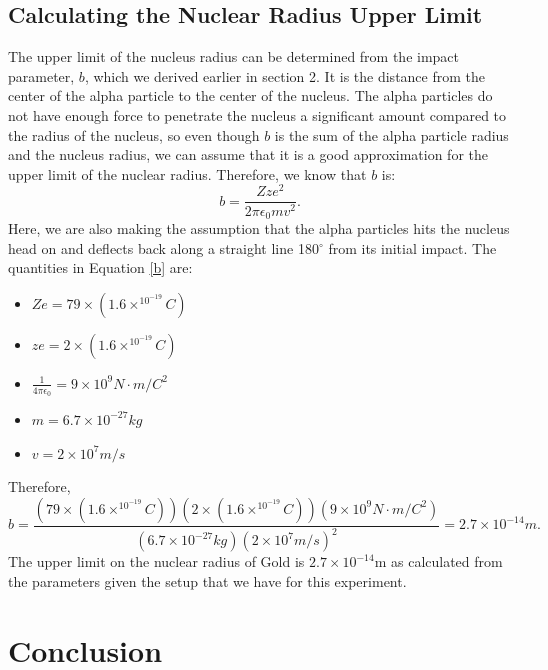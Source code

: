 \subsection{Calculating the Nuclear Radius Upper Limit}
The upper limit of the nucleus radius can be determined from the impact parameter, $b$, which we derived earlier in section 2. It is the distance from the center of the alpha particle to the center of the nucleus. The alpha particles do not have enough force to penetrate the nucleus a significant amount compared to the radius of the nucleus, so even though $b$ is the sum of the alpha particle radius and the nucleus radius, we can assume that it is a good approximation for the upper limit of the nuclear radius. Therefore, we know that $b$ is: \begin{equation} \label{b}b= \frac{Zze^2}{2\pi \epsilon_0 mv^2}.\end{equation} Here, we are also making the assumption that the alpha particles hits the nucleus head on and deflects back along a straight line 180$^\circ$ from its initial impact. The quantities in Equation \ref{b} are:
\begin{itemize}
\item $Ze=79\times (1.6\times^10^{-19} C)$
\item $ze= 2\times(1.6\times^10^{-19} C)$
\item $\frac{1}{4\pi\epsilon_0}=9\times10^9 N\cdot m/ C^2$
\item $m=6.7\times10^{-27} kg$
\item $v=2\times 10^7 m/s$
\end{itemize}
Therefore, \begin{equation} b= \frac{(79\times (1.6\times^10^{-19} C))(2\times(1.6\times^10^{-19} C))(9\times10^9 N\cdot m/ C^2)}{(6.7\times10^{-27} kg)(2\times 10^7 m/s)^2}=2.7\times10^{-14}m.\end{equation}
The upper limit on the nuclear radius of Gold is $2.7\times10^{-14}$m as calculated from the parameters given the setup that we have for this experiment.


\section{Conclusion}
